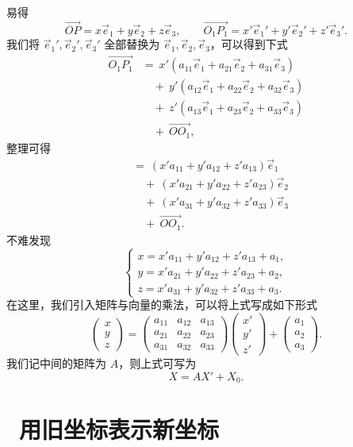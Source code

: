 \documentclass[UTF8,11pt]{ctexart}
\theoremstyle{cnthm}
\begin{document}
易得
\[
\overrightarrow{OP}=x\vec e_1+y\vec e_2+z\vec e_3,\qquad
\overrightarrow{O_1P_1}
=x'\vec e_1'+y'\vec e_2'+z'\vec e_3' .
\]
我们将 $\vec e_1',\vec e_2',\vec e_3'$ 全部替换为
$\vec e_1,\vec e_2,\vec e_3$，可以得到下式
\[
\begin{aligned}
\overrightarrow{O_1P_1}
&=\ x'(a_{11}\vec e_1+a_{21}\vec e_2+a_{31}\vec e_3)\\
&\quad+\ y'(a_{12}\vec e_1+a_{22}\vec e_2+a_{32}\vec e_3)\\
&\quad+\ z'(a_{13}\vec e_1+a_{23}\vec e_2+a_{33}\vec e_3)\\
&\quad+\ \overrightarrow{OO_1},
\end{aligned}
\]
整理可得
\[
\begin{aligned}
&=\ (x'a_{11}+y'a_{12}+z'a_{13})\vec e_1\\
&\quad+\ (x'a_{21}+y'a_{22}+z'a_{23})\vec e_2\\
&\quad+\ (x'a_{31}+y'a_{32}+z'a_{33})\vec e_3\\
&\quad+\ \overrightarrow{OO_1} .
\end{aligned}
\]
不难发现
\[
\begin{cases}
x=x'a_{11}+y'a_{12}+z'a_{13}+a_1,\\
y=x'a_{21}+y'a_{22}+z'a_{23}+a_2,\\
z=x'a_{31}+y'a_{32}+z'a_{33}+a_3 .
\end{cases}
\]
在这里，我们引入矩阵与向量的乘法，可以将上式写成如下形式
\[
\begin{pmatrix}
x\\y\\z
\end{pmatrix}
=
\begin{pmatrix}
a_{11} & a_{12} & a_{13}\\
a_{21} & a_{22} & a_{23}\\
a_{31} & a_{32} & a_{33}
\end{pmatrix}
\begin{pmatrix}
x'\\y'\\z'
\end{pmatrix}
+
\begin{pmatrix}
a_1\\a_2\\a_3
\end{pmatrix}.
\]
我们记中间的矩阵为 $A$，则上式可写为
\[
X=AX'+X_0 . \tag{1}
\]

\section{\ 用旧坐标表示新坐标}
\end{document}
